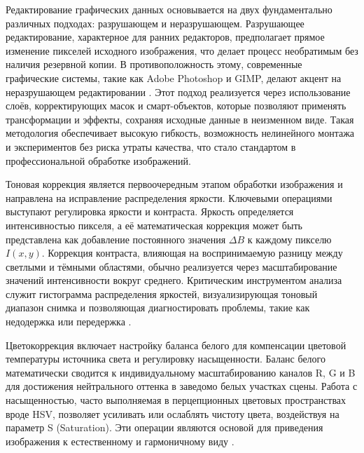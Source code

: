 \documentclass{SibFU-docs}
\begin{document}
Редактирование графических данных основывается на двух фундаментально различных подходах: разрушающем и неразрушающем. Разрушающее редактирование, характерное для ранних редакторов, предполагает прямое изменение пикселей исходного изображения, что делает процесс необратимым без наличия резервной копии. В противоположность этому, современные графические системы, такие как Adobe Photoshop и GIMP, делают акцент на неразрушающем редактировании \cite{adobe-helpx, gimp-docs}. Этот подход реализуется через использование слоёв, корректирующих масок и смарт-объектов, которые позволяют применять трансформации и эффекты, сохраняя исходные данные в неизменном виде. Такая методология обеспечивает высокую гибкость, возможность нелинейного монтажа и экспериментов без риска утраты качества, что стало стандартом в профессиональной обработке изображений.


Тоновая коррекция является первоочередным этапом обработки изображения и направлена на исправление распределения яркости. Ключевыми операциями выступают регулировка яркости и контраста. Яркость определяется интенсивностью пикселя, а её математическая коррекция может быть представлена как добавление постоянного значения $\Delta B$ к каждому пикселю $I(x, y)$. Коррекция контраста, влияющая на воспринимаемую разницу между светлыми и тёмными областями, обычно реализуется через масштабирование значений интенсивности вокруг среднего. Критическим инструментом анализа служит гистограмма распределения яркостей, визуализирующая тоновый диапазон снимка и позволяющая диагностировать проблемы, такие как недодержка или передержка \cite{rucomp}.

Цветокоррекция включает настройку баланса белого для компенсации цветовой температуры источника света и регулировку насыщенности. Баланс белого математически сводится к индивидуальному масштабированию каналов R, G и B для достижения нейтрального оттенка в заведомо белых участках сцены. Работа с насыщенностью, часто выполняемая в перцепционных цветовых пространствах вроде HSV, позволяет усиливать или ослаблять чистоту цвета, воздействуя на параметр S (Saturation). Эти операции являются основой для приведения изображения к естественному и гармоничному виду \cite{adobe-helpx}.

\end{document}
